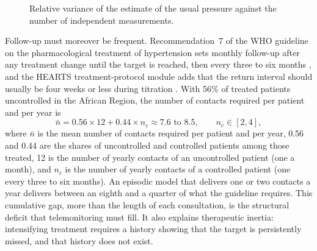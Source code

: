 \begin{figure}[htbp]
\centering
{}
\caption{Relative variance of the estimate of the usual pressure against the number of independent measurements.}\label{fig:variability}
\end{figure}

Follow-up must moreover be frequent. Recommendation~7 of the WHO guideline on the pharmacological treatment of hypertension sets monthly follow-up after any treatment change until the target is reached, then every three to six months \parencite{who2021guideline}, and the HEARTS treatment-protocol module adds that the return interval should usually be four weeks or less during titration \parencite{whoHEARTS}. With 56\% of treated patients uncontrolled in the African Region, the number of contacts required per patient and per year is
\begin{equation}
  \bar n = 0.56 \times 12 + 0.44 \times n_c \approx 7.6 \text{ to } 8.5, \qquad n_c \in [2,4],
\end{equation}
where $\bar n$ is the mean number of contacts required per patient and per year, 0.56 and 0.44 are the shares of uncontrolled and controlled patients among those treated, 12 is the number of yearly contacts of an uncontrolled patient (one a month), and $n_c$ is the number of yearly contacts of a controlled patient (one every three to six months). An episodic model that delivers one or two contacts a year delivers between an eighth and a quarter of what the guideline requires. This cumulative gap, more than the length of each consultation, is the structural deficit that telemonitoring must fill. It also explains therapeutic inertia: intensifying treatment requires a history showing that the target is persistently missed, and that history does not exist.

